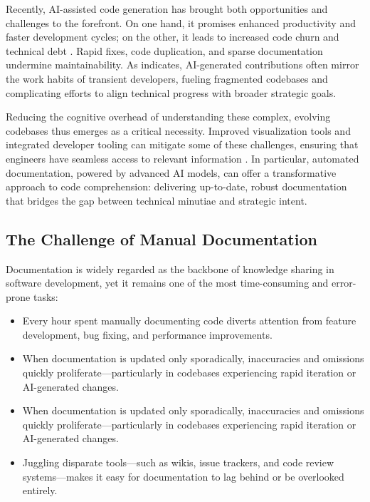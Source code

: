 \documentclass[12pt,oneside]{article}
\begin{document}
Recently, AI-assisted code generation has brought both opportunities and challenges to the forefront. On one hand, 
it promises enhanced productivity and faster development cycles; on the other, it leads to increased code churn and 
technical debt \textcite{pandi2023}. Rapid fixes, code duplication, and sparse documentation undermine maintainability. 
As \textcite{gitclear2024} indicates, AI-generated contributions often mirror the work habits of transient developers, 
fueling fragmented codebases and complicating efforts to align technical progress with broader strategic goals.

Reducing the cognitive overhead of understanding these complex, evolving codebases thus emerges as a critical 
necessity. Improved visualization tools and integrated developer tooling can mitigate some of these challenges, 
ensuring that engineers have seamless access to relevant information \textcite{meyer2021today}. In particular, 
automated documentation, powered by advanced AI models, can offer a transformative approach to code comprehension: 
delivering up-to-date, robust documentation that bridges the gap between technical minutiae and strategic intent.

\subsection{The Challenge of Manual Documentation}

Documentation is widely regarded as the backbone of knowledge sharing in software development, yet it remains one of 
the most time-consuming and error-prone tasks:

\begin{itemize}
    \item Every hour spent manually documenting code diverts attention from feature development, bug fixing, and 
    performance improvements.
    \item When documentation is updated only sporadically, inaccuracies and omissions quickly proliferate—particularly 
    in codebases experiencing rapid iteration or AI-generated changes.
    \item When documentation is updated only sporadically, inaccuracies and omissions quickly proliferate—particularly 
    in codebases experiencing rapid iteration or AI-generated changes.
    \item Juggling disparate tools—such as wikis, issue trackers, and code review systems—makes it easy for documentation 
    to lag behind or be overlooked entirely.
\end{itemize}
\end{document}
